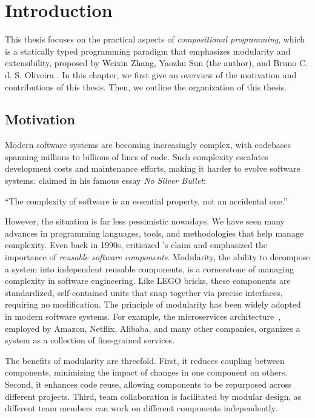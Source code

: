 \chapter{Introduction} \label{ch:introduction}

This thesis focuses on the practical aspects of \emph{compositional
programming}, which is a statically typed programming paradigm that emphasizes
modularity and extensibility, proposed by Weixin Zhang, Yaozhu Sun (the author),
and Bruno C. d. S. Oliveira \citeyearpar{zhang2021compositional}. In this
chapter, we first give an overview of the motivation and contributions of this
thesis. Then, we outline the organization of this thesis.

\section{Motivation}

Modern software systems are becoming increasingly complex, with codebases
spanning millions to billions of lines of code. Such complexity escalates
development costs and maintenance efforts, making it harder to evolve software
systems. \citet{brooks1987no} claimed in his famous essay \emph{No Silver Bullet}:
\begin{quoting}
``The complexity of software is an essential property, not an accidental one.''
\end{quoting}
However, the situation is far less pessimistic nowadays. We have seen many
advances in programming languages, tools, and methodologies that help manage
complexity. Even back in 1990s, \citet{cox95no} criticized
\citeauthor{brooks1987no}'s claim and emphasized the importance of
\emph{reusable software components}. Modularity, the ability to decompose a
system into independent reusable components, is a cornerstone of managing
complexity in software engineering. Like LEGO bricks, these components are
standardized, self-contained units that snap together via precise interfaces,
requiring no modification. The principle of modularity has been widely adopted
in modern software systems. For example, the microservices
architecture~\citep{richardson2018microservices}, employed by Amazon, Netflix,
Alibaba, and many other companies, organizes a system as a collection of
fine-grained services.

The benefits of modularity are threefold. First, it reduces coupling between
components, minimizing the impact of changes in one component on others. Second,
it enhances code reuse, allowing components to be repurposed across different
projects. Third, team collaboration is facilitated by modular design, as
different team members can work on different components independently.


